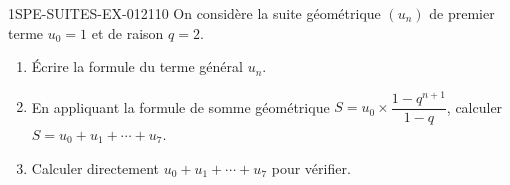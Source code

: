 \begin{exercice}{1SPE-SUITES-EX-012}{1}{10}
On considère la suite géométrique $(u_n)$ de premier terme $u_0 = 1$ et de raison $q = 2$.
\begin{enumerate}
  \item Écrire la formule du terme général $u_n$.
  \item En appliquant la formule de somme géométrique
        $S = u_0 \times \dfrac{1 - q^{n+1}}{1 - q}$,
        calculer $S = u_0 + u_1 + \cdots + u_7$.
  \item Calculer directement $u_0 + u_1 + \cdots + u_7$ pour vérifier.
\end{enumerate}
\end{exercice}
